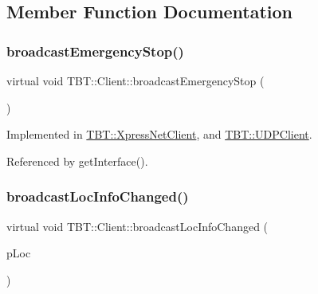 \subsection{Member Function Documentation}
\mbox{\label{classTBT_1_1Client_a59459df809a663bcbbb6d31fbfa09402_a59459df809a663bcbbb6d31fbfa09402}} 
\subsubsection{\texorpdfstring{broadcast\+Emergency\+Stop()}{broadcastEmergencyStop()}}
{\footnotesize\ttfamily virtual void T\+B\+T\+::\+Client\+::broadcast\+Emergency\+Stop (\begin{DoxyParamCaption}\item[{void}]{ }\end{DoxyParamCaption})\hspace{0.3cm}{\ttfamily [pure virtual]}}



Implemented in \hyperlink{classTBT_1_1XpressNetClient_a5909e439836c772127bc24918aa0a291_a5909e439836c772127bc24918aa0a291}{T\+B\+T\+::\+Xpress\+Net\+Client}, and \hyperlink{classTBT_1_1UDPClient_a378d141aa807a685b1e70adaacd5fc17_a378d141aa807a685b1e70adaacd5fc17}{T\+B\+T\+::\+U\+D\+P\+Client}.



Referenced by get\+Interface().

\mbox{\label{classTBT_1_1Client_aeb3b63a37edc6b95872df54a57c27a71_aeb3b63a37edc6b95872df54a57c27a71}} 
\subsubsection{\texorpdfstring{broadcast\+Loc\+Info\+Changed()}{broadcastLocInfoChanged()}}
{\footnotesize\ttfamily virtual void T\+B\+T\+::\+Client\+::broadcast\+Loc\+Info\+Changed (\begin{DoxyParamCaption}\item[{\hyperlink{classTBT_1_1LocDecoder}{Loc\+Decoder} $\ast$}]{p\+Loc }\end{DoxyParamCaption})\hspace{0.3cm}{\ttfamily [pure virtual]}}



